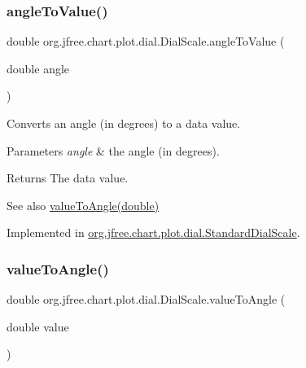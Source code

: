 \subsubsection{\texorpdfstring{angle\+To\+Value()}{angleToValue()}}
{\footnotesize\ttfamily double org.\+jfree.\+chart.\+plot.\+dial.\+Dial\+Scale.\+angle\+To\+Value (\begin{DoxyParamCaption}\item[{double}]{angle }\end{DoxyParamCaption})}

Converts an angle (in degrees) to a data value.


\begin{DoxyParams}{Parameters}
{\em angle} & the angle (in degrees).\\
\hline
\end{DoxyParams}
\begin{DoxyReturn}{Returns}
The data value.
\end{DoxyReturn}
\begin{DoxySeeAlso}{See also}
\mbox{\hyperlink{interfaceorg_1_1jfree_1_1chart_1_1plot_1_1dial_1_1_dial_scale_a62e51ecfa46b525c6476d99e69472d9e}{value\+To\+Angle(double)}} 
\end{DoxySeeAlso}


Implemented in \mbox{\hyperlink{classorg_1_1jfree_1_1chart_1_1plot_1_1dial_1_1_standard_dial_scale_a0fadcd7cb0f8a32db1fa1cc3add12a35}{org.\+jfree.\+chart.\+plot.\+dial.\+Standard\+Dial\+Scale}}.

\mbox{\label{interfaceorg_1_1jfree_1_1chart_1_1plot_1_1dial_1_1_dial_scale_a62e51ecfa46b525c6476d99e69472d9e}} 
\subsubsection{\texorpdfstring{value\+To\+Angle()}{valueToAngle()}}
{\footnotesize\ttfamily double org.\+jfree.\+chart.\+plot.\+dial.\+Dial\+Scale.\+value\+To\+Angle (\begin{DoxyParamCaption}\item[{double}]{value }\end{DoxyParamCaption})}

